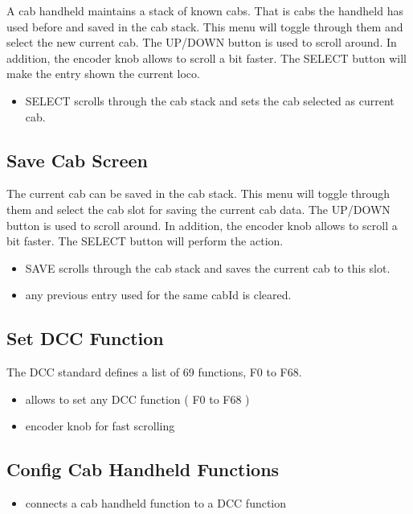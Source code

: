 A cab handheld maintains a stack of known cabs. That is cabs the handheld has used before and saved in the cab stack. This menu will toggle through them and select the new current cab. The UP/DOWN button is used to scroll around. In addition, the encoder knob allows to scroll a bit faster. The SELECT button will make the entry shown the current loco.

\begin{itemize}
\item SELECT scrolls through the cab stack and sets the cab selected as current cab.
\end{itemize}

\subsection{Save Cab Screen}

The current cab can be saved in the cab stack. This menu will toggle through them and select the cab slot for saving the current cab data. The UP/DOWN button is used to scroll around. In addition, the encoder knob allows to scroll a bit faster. The SELECT button will perform the action.

\begin{itemize}
\item SAVE scrolls through the cab stack and saves the current cab to this slot.
\item any previous entry used for the same cabId is cleared.
\end{itemize}

\subsection{Set DCC Function}

The DCC standard defines a list of 69 functions, F0 to F68.

\begin{itemize}
\item allows to set any DCC function ( F0 to F68 )
\item encoder knob for fast scrolling
\end{itemize}

\subsection{Config Cab Handheld Functions}

\begin{itemize}
\item connects a cab handheld function to a DCC function
\end{itemize}

